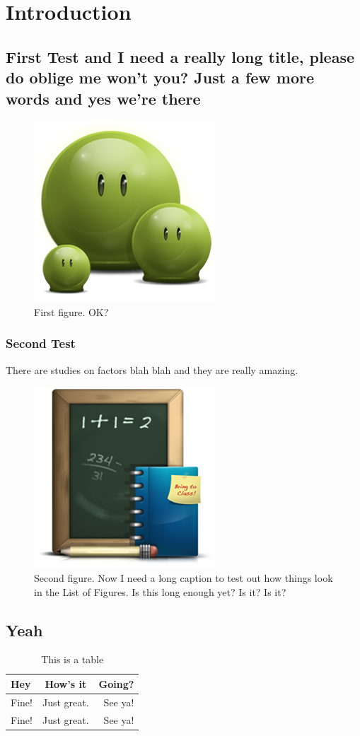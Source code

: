 \chapter{Introduction}
\section{First Test and I need a really long title, please do oblige me won't you? Just a few more words and yes we're there}
\lipsum[1-4]

\begin{figure}[hbt!]\centering
\includegraphics[width=.3\textwidth]{green}
\caption{First figure. OK?}
\end{figure}

\subsection{Second Test}
There are studies on factors blah blah \cite{audibert:2004} and they are really amazing\cite{budanitsky:hirst:2006}.

\begin{figure}[hbt!]\centering
\includegraphics[width=.3\textwidth]{school}
\caption{Second figure. Now I need a long caption to test out how things look in the List of Figures. Is this long enough yet? Is it? Is it?}
\end{figure}

\section{Yeah}
\lipsum[5-6]

\begin{table}[hbt!]
\caption{This is a table}
\centering
\begin{tabular}{ l c r }
\hline
Hey & How's it & Going?\\ \hline
Fine! & Just great. & See ya!\\
Fine! & Just great. & See ya!\\
\hline
\end{tabular}
\end{table}